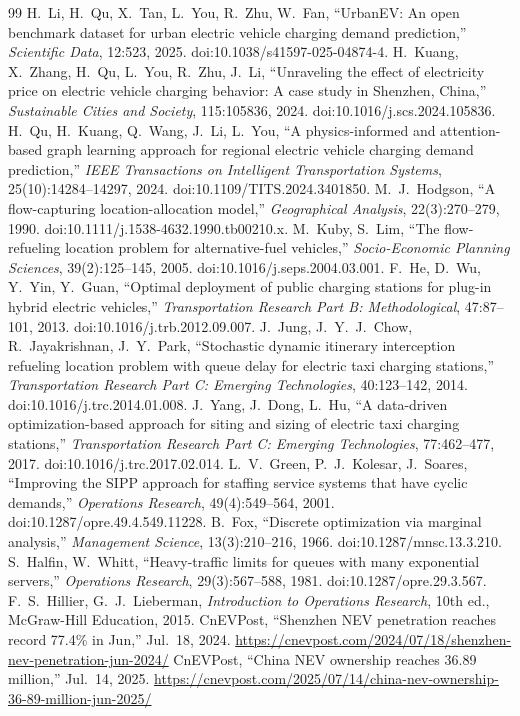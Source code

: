 \documentclass[11pt,a4paper]{article}
\begin{document}
\begin{thebibliography}{99}\small
{} H.~Li, H.~Qu, X.~Tan, L.~You, R.~Zhu, W.~Fan, ``UrbanEV: An open benchmark dataset for urban electric vehicle charging demand prediction,'' \emph{Scientific Data}, 12:523, 2025. doi:10.1038/s41597-025-04874-4.
 H.~Kuang, X.~Zhang, H.~Qu, L.~You, R.~Zhu, J.~Li, ``Unraveling the effect of electricity price on electric vehicle charging behavior: A case study in Shenzhen, China,'' \emph{Sustainable Cities and Society}, 115:105836, 2024. doi:10.1016/j.scs.2024.105836.
 H.~Qu, H.~Kuang, Q.~Wang, J.~Li, L.~You, ``A physics-informed and attention-based graph learning approach for regional electric vehicle charging demand prediction,'' \emph{IEEE Transactions on Intelligent Transportation Systems}, 25(10):14284--14297, 2024. doi:10.1109/TITS.2024.3401850.
 M.~J.~Hodgson, ``A flow-capturing location-allocation model,'' \emph{Geographical Analysis}, 22(3):270--279, 1990. doi:10.1111/j.1538-4632.1990.tb00210.x.
 M.~Kuby, S.~Lim, ``The flow-refueling location problem for alternative-fuel vehicles,'' \emph{Socio-Economic Planning Sciences}, 39(2):125--145, 2005. doi:10.1016/j.seps.2004.03.001.
 F.~He, D.~Wu, Y.~Yin, Y.~Guan, ``Optimal deployment of public charging stations for plug-in hybrid electric vehicles,'' \emph{Transportation Research Part B: Methodological}, 47:87--101, 2013. doi:10.1016/j.trb.2012.09.007.
 J.~Jung, J.~Y.~J.~Chow, R.~Jayakrishnan, J.~Y.~Park, ``Stochastic dynamic itinerary interception refueling location problem with queue delay for electric taxi charging stations,'' \emph{Transportation Research Part C: Emerging Technologies}, 40:123--142, 2014. doi:10.1016/j.trc.2014.01.008.
 J.~Yang, J.~Dong, L.~Hu, ``A data-driven optimization-based approach for siting and sizing of electric taxi charging stations,'' \emph{Transportation Research Part C: Emerging Technologies}, 77:462--477, 2017. doi:10.1016/j.trc.2017.02.014.
 L.~V.~Green, P.~J.~Kolesar, J.~Soares, ``Improving the SIPP approach for staffing service systems that have cyclic demands,'' \emph{Operations Research}, 49(4):549--564, 2001. doi:10.1287/opre.49.4.549.11228.
 B.~Fox, ``Discrete optimization via marginal analysis,'' \emph{Management Science}, 13(3):210--216, 1966. doi:10.1287/mnsc.13.3.210.
 S.~Halfin, W.~Whitt, ``Heavy-traffic limits for queues with many exponential servers,'' \emph{Operations Research}, 29(3):567--588, 1981. doi:10.1287/opre.29.3.567.
 F.~S.~Hillier, G.~J.~Lieberman, \emph{Introduction to Operations Research}, 10th ed., McGraw-Hill Education, 2015.
 CnEVPost, ``Shenzhen NEV penetration reaches record 77.4\% in Jun,'' Jul.~18, 2024. \url{https://cnevpost.com/2024/07/18/shenzhen-nev-penetration-jun-2024/}
 CnEVPost, ``China NEV ownership reaches 36.89 million,'' Jul.~14, 2025. \url{https://cnevpost.com/2025/07/14/china-nev-ownership-36-89-million-jun-2025/}
\end{thebibliography}
\end{document}
